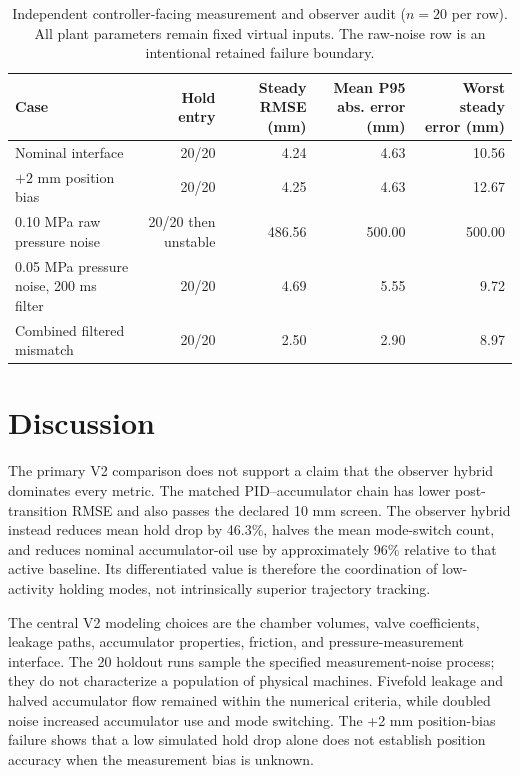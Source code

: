 \documentclass[machines,article,submit,pdftex,moreauthors]{Definitions/mdpi}
\begin{document}
\begin{table}[H]
\centering
\caption{Independent controller-facing measurement and observer audit ($n=20$ per row). All plant parameters remain fixed virtual inputs. The raw-noise row is an intentional retained failure boundary.}
\label{tab:measurement-audit}
\scriptsize
\setlength{\tabcolsep}{3pt}
\begin{tabularx}{\linewidth}{@{}X r r r r@{}}
\toprule
Case & Hold entry & Steady RMSE (mm) & Mean P95 abs. error (mm) & Worst steady error (mm) \\
\midrule
Nominal interface & 20/20 & 4.24 & 4.63 & 10.56 \\
$+2$ mm position bias & 20/20 & 4.25 & 4.63 & 12.67 \\
0.10 MPa raw pressure noise & 20/20 then unstable & 486.56 & 500.00 & 500.00 \\
0.05 MPa pressure noise, 200 ms filter & 20/20 & 4.69 & 5.55 & 9.72 \\
Combined filtered mismatch & 20/20 & 2.50 & 2.90 & 8.97 \\
\bottomrule
\end{tabularx}
\end{table}

\section{Discussion}
The primary V2 comparison does not support a claim that the observer hybrid dominates every metric. The matched PID--accumulator chain has lower post-transition RMSE and also passes the declared 10 mm screen. The observer hybrid instead reduces mean hold drop by 46.3\%, halves the mean mode-switch count, and reduces nominal accumulator-oil use by approximately 96\% relative to that active baseline. Its differentiated value is therefore the coordination of low-activity holding modes, not intrinsically superior trajectory tracking.

The central V2 modeling choices are the chamber volumes, valve coefficients, leakage paths, accumulator properties, friction, and pressure-measurement interface. The 20 holdout runs sample the specified measurement-noise process; they do not characterize a population of physical machines. Fivefold leakage and halved accumulator flow remained within the numerical criteria, while doubled noise increased accumulator use and mode switching. The +2 mm position-bias failure shows that a low simulated hold drop alone does not establish position accuracy when the measurement bias is unknown.
\end{document}

